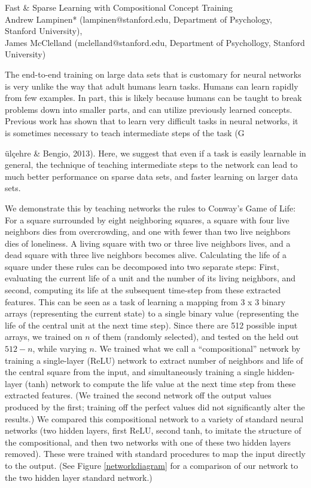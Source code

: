 \documentclass[10pt]{article}
\begin{document}
\begingroup  
  \centering
  \large Fast \& Sparse Learning with Compositional Concept Training\\[1em]
  \small{Andrew Lampinen* (lampinen@stanford.edu, Department of Psychology, Stanford University),\\ James McClelland (mclelland@stanford.edu, Department of Psychollogy, Stanford University)}\par
\endgroup
\vspace{10pt}
The end-to-end training on large data sets that is customary for neural networks is very unlike the way that adult humans learn tasks. Humans can learn rapidly from few examples. In part, this is likely because humans can be taught to break problems down into smaller parts, and can utilize previously learned concepts. Previous work has shown that to learn very difficult tasks in neural networks, it is sometimes necessary to teach intermediate steps of the task (G{\"{u}l\c{c}ehre \& Bengio, 2013). Here, we suggest that even if a task is easily learnable in general, the technique of teaching intermediate steps to the network can lead to much better performance on sparse data sets, and faster learning on larger data sets.\par
We demonstrate this by teaching networks the rules to Conway's Game of Life: For a square surrounded by eight neighboring squares, a square with four live neighbors dies from overcrowding, and one with fewer than two live neighbors dies of loneliness. A living square with two or three live neighbors lives, and a dead square with three live neighbors becomes alive. Calculating the life of a square under these rules can be decomposed into two separate steps: First, evaluating the current life of a unit and the number of its living neighbors, and second, computing its life at the subsequent time-step from these extracted features. This can be seen as a task of learning a mapping from 3 x 3 binary arrays (representing the current state) to a single binary value (representing the life of the central unit at the next time step). Since there are 512 possible input arrays, we trained on $n$ of them (randomly selected), and tested on the held out $512-n$, while varying $n$. We trained what we call a ``compositional'' network by training a single-layer (ReLU) network to extract number of neighbors and life of the central square from the input, and simultaneously training a single hidden-layer (tanh) network to compute the life value at the next time step from these extracted features. (We trained the second network off the output values produced by the first; training off the perfect values did not significantly alter the results.) We compared this compositional network to a variety of standard neural networks (two hidden layers, first ReLU, second tanh, to imitate the structure of the compositional, and then two networks with one of these two hidden layers removed). These were trained with standard procedures to map the input directly to the output. (See Figure \ref{networkdiagram} for a comparison of our network to the two hidden layer standard network.)\par
}
\end{document}
